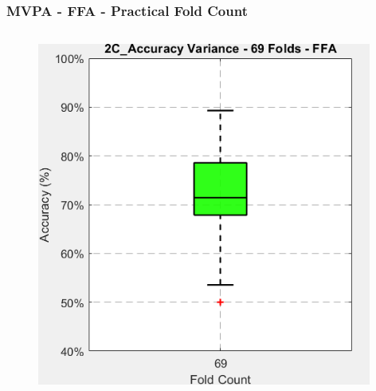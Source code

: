 \begin{frame}
\frametitle{MVPA - FFA - Practical Fold Count}
	\begin{columns}
		\begin{column}{0.49\textwidth}		
			\begin{itemize}
			\end{itemize}
			\begin{figure}
				\centering
				\includegraphics[width=0.98\textwidth]{assets/box_2C_69_ffa.png}
			\end{figure}
		\end{column}


\end{columns}
\end{frame}
